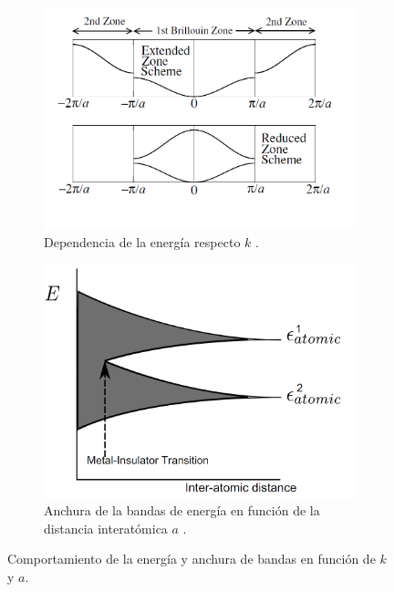 \begin{figure}[h!]\centering
	\begin{subfigure}{0.46\linewidth} \centering
		\includegraphics[scale=0.45]{Cuerpo/Ch_07/Oxford-08.png}
		\caption{Dependencia de la energía respecto $k$ \cite{Oxford_Solid_State}.}
		\label{Fig:07-01-04}
	\end{subfigure}
	\begin{subfigure}{0.46\linewidth} \centering
		\includegraphics[scale=0.25]{Cuerpo/Ch_07/Oxford-09.png}
		\caption{Anchura de la bandas de energía en función de la distancia interatómica $a$ \cite{Oxford_Solid_State}.}
		\label{Fig:07-01-05}
	\end{subfigure}
	\caption{Comportamiento de la energía y anchura de bandas en función de $k$ y $a$.}
\end{figure}


